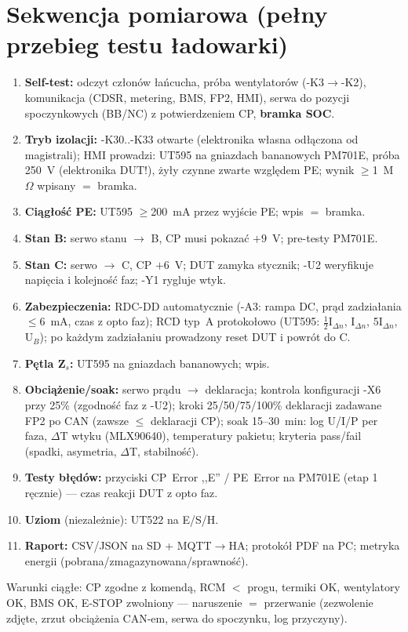 \documentclass[11pt,a4paper]{article}
\newcommand{\ohm}{$\Omega$}
\begin{document}
\section{Sekwencja pomiarowa (pełny przebieg testu ładowarki)}
\begin{enumerate}
\item \textbf{Self-test:} odczyt członów łańcucha, próba wentylatorów (-K3$\to$-K2), komunikacja
(CDSR, metering, BMS, FP2, HMI), serwa do pozycji spoczynkowych (BB/NC) z potwierdzeniem CP,
\textbf{bramka SOC}.
\item \textbf{Tryb izolacji:} -K30..-K33 otwarte (elektronika własna odłączona od magistrali);
HMI prowadzi: UT595 na gniazdach bananowych PM701E, próba 250~V (elektronika DUT!), żyły czynne
zwarte względem PE; wynik $\ge$1~M\ohm{} wpisany $=$ bramka.
\item \textbf{Ciągłość PE:} UT595 $\ge$200~mA przez wyjście PE; wpis $=$ bramka.
\item \textbf{Stan B:} serwo stanu $\to$ B, CP musi pokazać $+9$~V; pre-testy PM701E.
\item \textbf{Stan C:} serwo $\to$ C, CP $+6$~V; DUT zamyka stycznik; -U2 weryfikuje napięcia
i kolejność faz; -Y1 rygluje wtyk.
\item \textbf{Zabezpieczenia:} RDC-DD automatycznie (-A3: rampa DC, prąd zadziałania $\le$6~mA,
czas z opto faz); RCD typ~A protokołowo (UT595: $\frac{1}{2}$I$_{\Delta n}$, I$_{\Delta n}$,
5I$_{\Delta n}$, U$_B$); po każdym zadziałaniu prowadzony reset DUT i powrót do C.
\item \textbf{Pętla Z$_s$:} UT595 na gniazdach bananowych; wpis.
\item \textbf{Obciążenie/soak:} serwo prądu $\to$ deklaracja; kontrola konfiguracji -X6 przy 25\%
(zgodność faz z -U2); kroki 25/50/75/100\% deklaracji zadawane FP2 po CAN (zawsze $\le$ deklaracji
CP); soak 15--30~min: log U/I/P per faza, $\Delta$T wtyku (MLX90640), temperatury pakietu;
kryteria pass/fail (spadki, asymetria, $\Delta$T, stabilność).
\item \textbf{Testy błędów:} przyciski CP~Error ,,E'' / PE~Error na PM701E (etap 1 ręcznie) ---
czas reakcji DUT z opto faz.
\item \textbf{Uziom} (niezależnie): UT522 na E/S/H.
\item \textbf{Raport:} CSV/JSON na SD + MQTT$\to$HA; protokół PDF na PC; metryka energii
(pobrana/zmagazynowana/sprawność).
\end{enumerate}
Warunki ciągłe: CP zgodne z komendą, RCM $<$ progu, termiki OK, wentylatory OK, BMS OK, E-STOP
zwolniony --- naruszenie $=$ przerwanie (zezwolenie zdjęte, zrzut obciążenia CAN-em, serwa do
spoczynku, log przyczyny).
\end{document}
